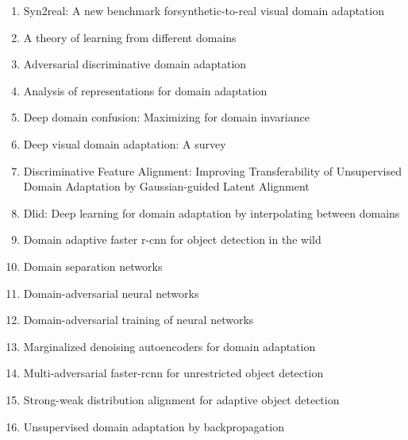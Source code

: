 \documentclass[acmlarge]{acmart}
\begin{document}
\begin{enumerate}
	\item Syn2real: A new benchmark forsynthetic-to-real visual domain adaptation \cite{peng2018syn2real} 

	\item A theory of learning from different domains \cite{ben2010theory} 

	\item Adversarial discriminative domain adaptation \cite{tzeng2017adversarial} 

	\item Analysis of representations for domain adaptation \cite{ben2007analysis} 

	\item Deep domain confusion: Maximizing for domain invariance \cite{tzeng2014deep} 

	\item Deep visual domain adaptation: A survey \cite{wang2018deep} 

	\item Discriminative Feature Alignment: Improving Transferability of Unsupervised Domain Adaptation by Gaussian-guided Latent Alignment \cite{wang2020discriminative} 

	\item Dlid: Deep learning for domain adaptation by interpolating between domains \cite{chopra2013dlid} 

	\item Domain adaptive faster r-cnn for object detection in the wild \cite{chen2018domain} 

	\item Domain separation networks \cite{bousmalis2016domain} 

	\item Domain-adversarial neural networks \cite{ajakan2014domain} 

	\item Domain-adversarial training of neural networks \cite{ganin2016domain} 

	\item Marginalized denoising autoencoders for domain adaptation \cite{chen2012marginalized} 

	\item Multi-adversarial faster-rcnn for unrestricted object detection \cite{he2019multi} 

	\item Strong-weak distribution alignment for adaptive object detection \cite{saito2019strong} 

	\item Unsupervised domain adaptation by backpropagation \cite{ganin2015unsupervised} 


\end{enumerate}
\end{document}
